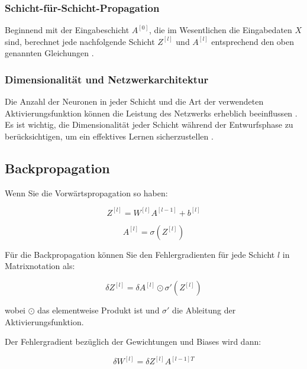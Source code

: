 \subsubsection{Schicht-für-Schicht-Propagation}
Beginnend mit der Eingabeschicht \( A^{[0]} \), die im Wesentlichen die Eingabedaten \( X \) sind, berechnet jede nachfolgende Schicht \( Z^{[l]} \) und \( A^{[l]} \) entsprechend den oben genannten Gleichungen \cite[p.~1421]{russell2021ai}.

\subsubsection{Dimensionalität und Netzwerkarchitektur}
Die Anzahl der Neuronen in jeder Schicht und die Art der verwendeten Aktivierungsfunktion können die Leistung des Netzwerks erheblich beeinflussen \cite[p.~1408]{russell2021ai}. Es ist wichtig, die Dimensionalität jeder Schicht während der Entwurfsphase zu berücksichtigen, um ein effektives Lernen sicherzustellen \cite[p.~73]{Chollet2021}.



\subsection{Backpropagation}

Wenn Sie die Vorwärtspropagation so haben:

\begin{equation}
Z^{[l]} = W^{[l]}A^{[l-1]} + b^{[l]}
\end{equation}

\begin{equation}
A^{[l]} = \sigma(Z^{[l]})
\end{equation}

Für die Backpropagation können Sie den Fehlergradienten für jede Schicht $l$ in Matrixnotation als:

\begin{equation}
\delta Z^{[l]} = \delta A^{[l]} \odot \sigma'(Z^{[l]})
\end{equation}

wobei $\odot$ das elementweise Produkt ist und $\sigma'$ die Ableitung der Aktivierungsfunktion.

Der Fehlergradient bezüglich der Gewichtungen und Biases wird dann:

\begin{equation}
\delta W^{[l]} = \delta Z^{[l]} A^{[l-1]T}
\end{equation}

